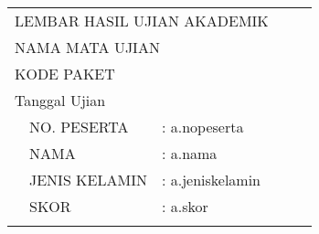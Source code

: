 \documentclass[12pt]{article}
\begin{document}
\thispagestyle{fancy}


\def\arraystretch{1.3}
\begin{table}[]
\centering
\begin{tabular}{llllm{11cm}l}

\multicolumn{5}{l}{\centerline{LEMBAR HASIL UJIAN AKADEMIK}   }       \\

\multicolumn{5}{l}{\centerline{NAMA MATA UJIAN}}                      \\

\multicolumn{5}{l}{\centerline{KODE PAKET}}                           \\ \hline

\multicolumn{5}{l}{Tanggal Ujian}                        \\
      & NO. PESERTA       & :  a.nopeserta    & 
\multicolumn{2}{l}{} \\
      & NAMA              & : a.nama    & 
\multicolumn{2}{l}{} \\
      & JENIS KELAMIN     & :  a.jeniskelamin   & 
\multicolumn{2}{l}{} \\
      & SKOR              & :  a.skor   & 
\multicolumn{2}{l}{} \\
      &                   &       &           &         
\end{tabular}
\end{table}
\def\arraystretch{1.5}
\end{document}
